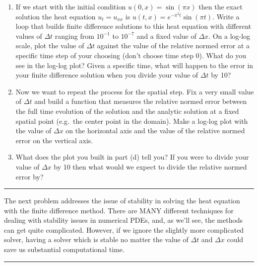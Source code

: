 \documentclass[
]{book}
\theoremstyle{definition}
\theoremstyle{definition}
\theoremstyle{definition}
\theoremstyle{remark}
\begin{document}
\begin{enumerate}
\def\labelenumi{\alph{enumi}.}
\setcounter{enumi}{2}
\item
  If we start with the initial condition \(u(0,x) = \sin(\pi x)\) then the exact solution the heat equation \(u_t = u_{xx}\) is \(u(t,x) = e^{-\pi^2 t}\sin(\pi t)\). Write a loop that builds finite difference solutions to this heat equation with different values of \(\Delta t\) ranging from \(10^{-1}\) to \(10^{-7}\) and a fixed value of \(\Delta x\). On a log-log scale, plot the value of \(\Delta t\) against the value of the relative normed error at a specific time step of your choosing (don't choose time step 0). What do you see in the log-log plot? Given a specific time, what will happen to the error in your finite difference solution when you divide your value of \(\Delta t\) by 10?
\item
  Now we want to repeat the process for the spatial step. Fix a very small value of \(\Delta t\) and build a function that measures the relative normed error between the full time evolution of the solution and the analytic solution at a fixed spatial point (e.g.~the center point in the domain). Make a log-log plot with the value of \(\Delta x\) on the horizontal axis and the value of the relative normed error on the vertical axis.
\item
  What does the plot you built in part (d) tell you? If you were to divide your value of \(\Delta x\) by 10 then what would we expect to divide the relative normed error by?
\end{enumerate}

\begin{center}\rule{0.5\linewidth}{0.5pt}\end{center}

The next problem addresses the issue of stability in solving the heat equation with the finite difference method. There are MANY different techniques for dealing with stability issues in numerical PDEs, and, as we'll see, the methods can get quite complicated. However, if we ignore the slightly more complicated solver, having a solver which is stable no matter the value of \(\Delta t\) and \(\Delta x\) could save us substantial computational time.

\begin{center}\rule{0.5\linewidth}{0.5pt}\end{center}
\end{document}
